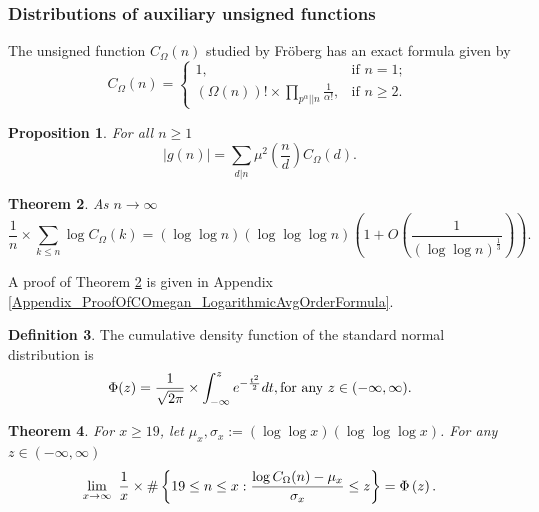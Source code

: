 \documentclass[11pt,reqno,a4letter]{article}
\newcommand{\hlocalref}[1]{\hyperref[#1]{\ref{#1}}}
\numberwithin{equation}{section}
\numberwithin{figure}{section}
\numberwithin{table}{section}
\theoremstyle{plain}
\newtheorem{theorem}{Theorem}
\newtheorem{prop}[theorem]{Proposition}
\numberwithin{theorem}{section}
\theoremstyle{definition}
\newtheorem{definition}[theorem]{Definition}
\theoremstyle{remark}
\newcommand{\mathtext}[1]{\text{\rm #1}}
\begin{document}
\subsubsection{Distributions of auxiliary unsigned functions}

The unsigned function $C_{\Omega}(n)$ studied by Fr\"oberg 
\cite{FROBERG-1968} has an exact formula given by 
\begin{equation}
\label{eqn_proof_tag_hInvn_ExactNestedSumFormula_CombInterpetIdent_v3}
C_{\Omega}(n) = \begin{cases}
     1, & \text{if $n = 1$; } \\ 
     (\Omega(n))! \times \prod\limits_{p^{\alpha}||n} \frac{1}{\alpha!}, & \text{if $n \geq 2$. }
     \end{cases}
\end{equation} 

\begin{prop} 
\label{lemma_AbsValueOf_gInvn_FornSquareFree_v1} 
For all $n \geq 1$ 
\begin{equation} 
\label{eqn_AbsValueOf_gInvn_FornSquareFree_v1} 
|g(n)| = \sum_{d|n} \mu^2\left(\frac{n}{d}\right) C_{\Omega}(d). 
\end{equation} 
\end{prop} 

\begin{theorem} 
\label{lemma_HatCAstxSum_ExactFormulaWithError_v1} 
As $n \rightarrow \infty$ 
\[
\frac{1}{n} \times \sum_{k \leq n} \log C_{\Omega}(k) = 
     (\log\log n)(\log\log\log n) \left(1 + 
     O\left(\frac{1}{(\log\log n)^{\frac{1}{3}}}\right)\right). 
\] 
\end{theorem} 

A proof of Theorem \hlocalref{lemma_HatCAstxSum_ExactFormulaWithError_v1} is 
given in Appendix \hlocalref{Appendix_ProofOfCOmegan_LogarithmicAvgOrderFormula}. 

\begin{definition}
The cumulative density function of the 
standard normal distribution is 
\[
\Phi(z) = \frac{1}{\sqrt{2\pi}} \times \int_{-\infty}^{z} e^{-\frac{t^2}{2}} dt, 
     \mathtext{ for any } z \in (-\infty, \infty). 
\]
\end{definition}

\begin{theorem}
\label{conj_DetFormOfEKTypeThmForCOmegan_v1} 
For $x \geq 19$, let $\mu_x, \sigma_x := (\log\log x)(\log\log\log x)$.
For any $z \in (-\infty, \infty)$ 
\begin{equation} 
\notag
\lim_{x \rightarrow \infty} \ \frac{1}{x} \times 
	\#\left\{19 \leq n \leq x: \frac{\log C_{\Omega}(n) - \mu_x}{\sigma_x} \leq z\right\} = 
     \Phi\left(z\right). 
\end{equation}
\end{theorem} 
\end{document}

